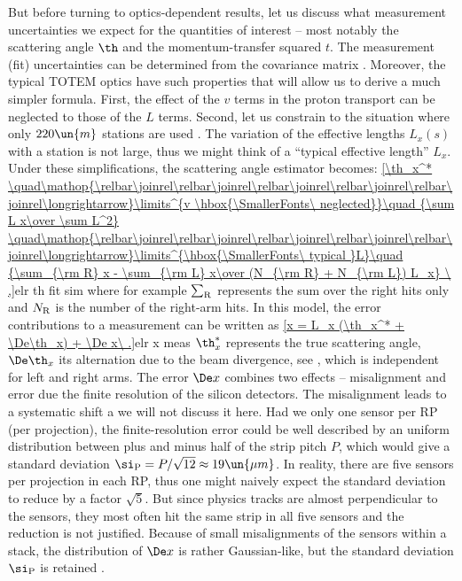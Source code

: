 But before turning to optics-dependent results, let us discuss what measurement uncertainties we expect for the quantities of interest -- most notably the scattering angle $\th$ and the momentum-transfer squared $t$. The measurement (fit) uncertainties can be determined from the covariance matrix . Moreover, the typical TOTEM optics  have such properties that will allow us to derive a much simpler formula. First, the effect of the $v$ terms in the proton transport  can be neglected to those of the $L$ terms. Second, let us constrain to the situation where only $220\un{m}$ stations are used . The variation of the effective lengths $L_x(s)$ with a station is not large, thus we might think of a ``typical effective length'' $L_x$. Under these simplifications, the scattering angle estimator becomes:
\eqref{\th_x^*
	\quad\mathop{\relbar\joinrel\relbar\joinrel\relbar\joinrel\relbar\joinrel\relbar\joinrel\longrightarrow}\limits^{v \hbox{\SmallerFonts\ neglected}}\quad
		{\sum L x\over \sum L^2}
	\quad\mathop{\relbar\joinrel\relbar\joinrel\relbar\joinrel\relbar\joinrel\relbar\joinrel\longrightarrow}\limits^{\hbox{\SmallerFonts\ typical }L}\quad
	{\sum_{\rm R} x - \sum_{\rm L} x\over (N_{\rm R} + N_{\rm L}) L_x}
\ ,}{elr th fit sim} 
where for example $\sum_{\rm R}$ represents the sum over the right hits only and $N_{\rm R}$ is the number of the right-arm hits. In this model, the error contributions to a measurement can be written as
\eqref{x = L_x (\th_x^* + \De\th_x) + \De x\ .}{elr x meas}
$\th_x^*$ represents the true scattering angle, $\De\th_x$ its alternation due to the beam divergence, see , which is independent for left and right arms. The error $\De x$ combines two effects -- misalignment and error due the finite resolution of the silicon detectors. The misalignment leads to a systematic shift a we will not discuss it here. Had we only one sensor per RP (per projection), the finite-resolution error could be well described by an uniform distribution between plus and minus half of the strip pitch $P$, which would give a standard deviation $\si_{\rm P} = P/\sqrt{12}\approx 19\un{\mu m}$. In reality, there are five sensors per projection in each RP, thus one might naively expect the standard deviation to reduce by a factor $\sqrt 5$. But since physics tracks are almost perpendicular to the sensors, they most often hit the same strip in all five sensors and the reduction is not justified. Because of small misalignments of the sensors within a stack, the distribution of $\De x$ is rather Gaussian-like, but the standard deviation $\si_{\rm P}$ is retained .

